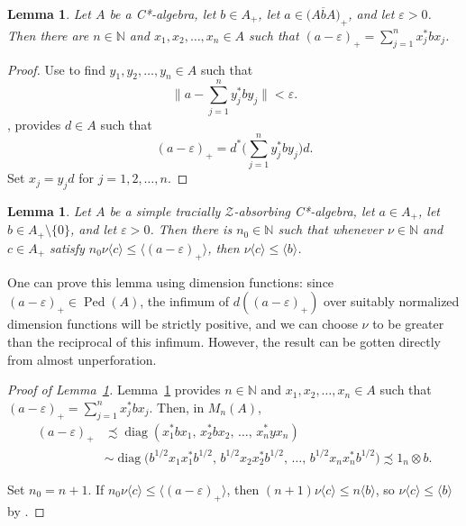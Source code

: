 \documentclass[11pt]{amsart}
\theoremstyle{plain}
\newtheorem{lemma}[theorem]{Lemma}
\theoremstyle{definition}
\theoremstyle{remark}
\numberwithin{equation}{section}
\newcommand{\N}{\mathbb{N}}
\newcommand{\Ped}{{\operatorname{Ped}}}
\newcommand{\ep}{\varepsilon}
\newcommand{\diag}{{\operatorname{diag}}}
\begin{document}
\begin{lemma}\label{L_8825_yStarby}
Let $A$ be a C*-algebra,
let $b \in A_{+}$,
let $a \in \bigl( {\overline{A b A}} \bigr)_{+}$,
and let $\ep > 0$.
Then there are $n \in \N$ and
$x_1, x_2, \ldots, x_n \in A$
such that $(a - \ep)_{+} = \sum_{j = 1}^n x_j^* b x_j$.
\end{lemma}

\begin{proof}
Use \cite[Lemma 1.13]{Ph14} to find
$y_1, y_2, \ldots, y_n \in A$
such that
\[
\Bigg\| a - \sum_{j = 1}^n y_j^* b y_j \Bigg\| < \ep.
\]
\cite[Lemma~2.1]{AGJP21}, provides $d \in A$ such that
\[
(a - \ep)_{+} = d^* \Bigg( \sum_{j = 1}^n y_j^* b y_j \Bigg) d.
\]
Set $x_j = y_j d$ for $j = 1, 2, \ldots, n$.
\end{proof}


\begin{lemma}\label{L_8825_DFSub}
Let $A$ be a simple tracially $\mathcal{Z}$-absorbing C*-algebra,
let $a \in A_{+}$,
let $b \in A_{+} \setminus \{ 0 \}$,
and let $\ep > 0$.
Then there is $n_0 \in \N$
such that whenever $\nu \in \N$
and $c \in A_{+}$
satisfy $n_0 \nu \langle c \rangle \leq \langle (a - \ep)_{+} \rangle$,
then
$\nu \langle c \rangle \leq \langle b \rangle$.
\end{lemma}

One can prove this lemma using dimension functions:
since $(a - \ep)_{+} \in \Ped (A)$,
the infimum of $d ((a - \ep)_{+})$ over suitably
normalized dimension functions will be strictly positive,
and we can choose $\nu$ to be greater than the reciprocal
of this infimum.
However,
the result can be gotten directly from
almost unperforation.

\begin{proof}[Proof of Lemma~\ref{L_8825_DFSub}]
Lemma~\ref{L_8825_yStarby}
provides $n \in \N$ and
$x_1, x_2, \ldots, x_n \in A$
such that $(a - \ep)_{+} = \sum_{j = 1}^n x_j^* b x_j$.
Then, in $M_n (A)$,
%
\begin{align*}
(a - \ep)_{+}
& \precsim
  \diag ( x_1^* b x_1, \, x_2^* b x_2, \, \ldots, \, x_n^* y x_n )
\\
& \sim \diag \bigl( b^{1/2} x_1 x_1^* b^{1/2},
     \, b^{1/2} x_2 x_2^* b^{1/2}, \, \ldots,
     \, b^{1/2} x_n x_n^* b^{1/2} \bigr)
  \precsim 1_n \otimes b.
\end{align*}
%

Set $n_0 = n + 1$.
If $n_0 \nu \langle c \rangle \leq \langle (a - \ep)_{+} \rangle$,
then $(n + 1) \nu \langle c \rangle \leq n \langle b \rangle$,
so $\nu \langle c \rangle \leq \langle b \rangle$
by \cite[Theorem~6.4]{AGJP21}.
\end{proof}
\end{document}
